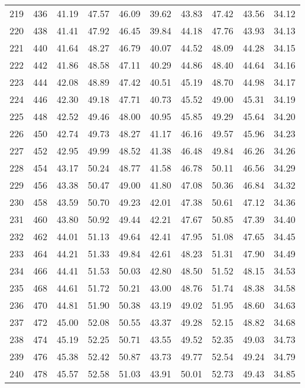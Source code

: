 \begin{longtable}{rrllllllll}
		219 & 436 & 41.19 & 47.57 & 46.09 & 39.62 & 43.83 & 47.42 & 43.56 & 34.12 \\ 
		220 & 438 & 41.41 & 47.92 & 46.45 & 39.84 & 44.18 & 47.76 & 43.93 & 34.13 \\ 
		221 & 440 & 41.64 & 48.27 & 46.79 & 40.07 & 44.52 & 48.09 & 44.28 & 34.15 \\ 
		222 & 442 & 41.86 & 48.58 & 47.11 & 40.29 & 44.86 & 48.40 & 44.64 & 34.16 \\ 
		223 & 444 & 42.08 & 48.89 & 47.42 & 40.51 & 45.19 & 48.70 & 44.98 & 34.17 \\ 
		224 & 446 & 42.30 & 49.18 & 47.71 & 40.73 & 45.52 & 49.00 & 45.31 & 34.19 \\ 
		225 & 448 & 42.52 & 49.46 & 48.00 & 40.95 & 45.85 & 49.29 & 45.64 & 34.20 \\ 
		226 & 450 & 42.74 & 49.73 & 48.27 & 41.17 & 46.16 & 49.57 & 45.96 & 34.23 \\ 
		227 & 452 & 42.95 & 49.99 & 48.52 & 41.38 & 46.48 & 49.84 & 46.26 & 34.26 \\ 
		228 & 454 & 43.17 & 50.24 & 48.77 & 41.58 & 46.78 & 50.11 & 46.56 & 34.29 \\ 
		229 & 456 & 43.38 & 50.47 & 49.00 & 41.80 & 47.08 & 50.36 & 46.84 & 34.32 \\ 
		230 & 458 & 43.59 & 50.70 & 49.23 & 42.01 & 47.38 & 50.61 & 47.12 & 34.36 \\ 
		231 & 460 & 43.80 & 50.92 & 49.44 & 42.21 & 47.67 & 50.85 & 47.39 & 34.40 \\ 
		232 & 462 & 44.01 & 51.13 & 49.64 & 42.41 & 47.95 & 51.08 & 47.65 & 34.45 \\ 
		233 & 464 & 44.21 & 51.33 & 49.84 & 42.61 & 48.23 & 51.31 & 47.90 & 34.49 \\ 
		234 & 466 & 44.41 & 51.53 & 50.03 & 42.80 & 48.50 & 51.52 & 48.15 & 34.53 \\ 
		235 & 468 & 44.61 & 51.72 & 50.21 & 43.00 & 48.76 & 51.74 & 48.38 & 34.58 \\ 
		236 & 470 & 44.81 & 51.90 & 50.38 & 43.19 & 49.02 & 51.95 & 48.60 & 34.63 \\ 
		237 & 472 & 45.00 & 52.08 & 50.55 & 43.37 & 49.28 & 52.15 & 48.82 & 34.68 \\ 
		238 & 474 & 45.19 & 52.25 & 50.71 & 43.55 & 49.52 & 52.35 & 49.03 & 34.73 \\ 
		239 & 476 & 45.38 & 52.42 & 50.87 & 43.73 & 49.77 & 52.54 & 49.24 & 34.79 \\ 
		240 & 478 & 45.57 & 52.58 & 51.03 & 43.91 & 50.01 & 52.73 & 49.43 & 34.85 \\ 

\end{longtable}
